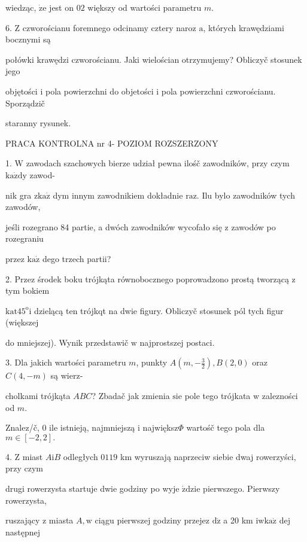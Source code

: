\documentclass[a4paper,12pt]{article}
\begin{document}
wiedząc, $\dot{\mathrm{z}}\mathrm{e}$ jest on $02$ większy od wartości parametru $m.$

6. $\mathrm{Z}$ czworościanu foremnego odcinamy cztery naroz $\mathrm{a}$, których krawędziami bocznymi są

połówki krawędzi czworościanu. Jaki wielościan otrzymujemy? Obliczyč stosunek jego

objętości $\mathrm{i}$ pola powierzchni do objetości $\mathrm{i}$ pola powierzchni czworościanu. Sporządzič

staranny rysunek.




PRACA KONTROLNA nr 4- POZIOM ROZSZERZONY

1. $\mathrm{W}$ zawodach szachowych bierze udział pewna ilośč zawodników, przy czym $\mathrm{k}\mathrm{a}\dot{\mathrm{z}}\mathrm{d}\mathrm{y}$ zawod-

nik gra $\mathrm{z}\mathrm{k}\mathrm{a}\dot{\mathrm{z}}$ dym innym zawodnikiem dokładnie $\mathrm{r}\mathrm{a}\mathrm{z}$. Ilu bylo zawodników tych zawodów,

jeśli rozegrano 84 partie, a dwóch zawodników wycofało się $\mathrm{z}$ zawodów po rozegraniu

przez $\mathrm{k}\mathrm{a}\dot{\mathrm{z}}$ dego trzech partii?

2. Przez środek boku trójkąta równobocznego poprowadzono prostą tworzącą $\mathrm{z}$ tym bokiem

$\mathrm{k}\mathrm{a}\mathrm{t}45^{\mathrm{o}}\mathrm{i}$ dzielącą ten trójkqt na dwie figury. Obliczyč stosunek pól tych figur (większej

do mniejszej). Wynik przedstawič $\mathrm{w}$ najprostszej postaci.

3. Dla jakich wartości parametru $m$, punkty $A(m,-\displaystyle \frac{3}{2}), B(2,0)$ oraz $C(4,-m)$ są wierz-

cholkami trójkąta $ABC$? Zbadač jak zmienia $\mathrm{s}\mathrm{i}\mathrm{e}$ pole tego trójkata $\mathrm{w}$ zalezności od $m.$

Znalez/č, $0$ ile istnieją, najmniejszą $\mathrm{i}$ największ$\Phi$ wartośč tego pola dla $m\in[-2,2].$

4. $\mathrm{Z}$ miast $A\mathrm{i}B$ odległych $0119$ km wyruszają naprzeciw siebie dwaj rowerzyści, przy czym

drugi rowerzysta startuje dwie godziny po wyje $\acute{\mathrm{z}}\mathrm{d}\mathrm{z}\mathrm{i}\mathrm{e}$ pierwszego. Pierwszy rowerzysta,

ruszający $\mathrm{z}$ miasta $A, \mathrm{w}$ ciągu pierwszej godziny przejez $\mathrm{d}\dot{\mathrm{z}}$ a 20 km $\mathrm{i}\mathrm{w}\mathrm{k}\mathrm{a}\dot{\mathrm{z}}$ dej następnej
\end{document}
